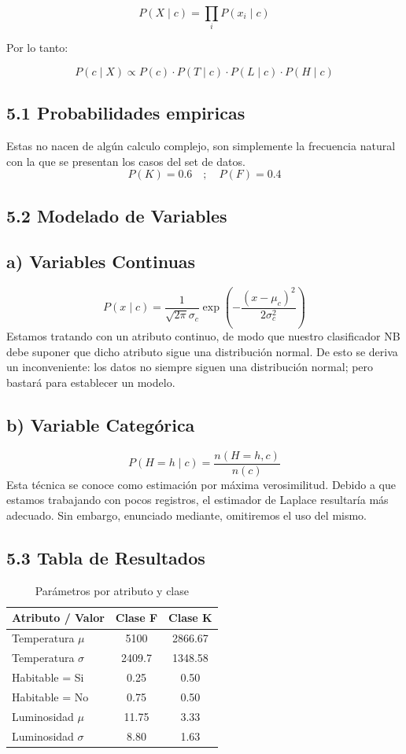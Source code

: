 \documentclass[11pt,a4paper]{article}
\begin{document}
\[
P(X \mid c) = \prod_{i} P(x_i \mid c)
\]

Por lo tanto:

\[
P(c \mid X) \propto P(c)\cdot P(T \mid c)\cdot P(L \mid c)\cdot P(H \mid c)
\]

\subsection*{5.1 Probabilidades empiricas}
Estas no nacen de algún calculo complejo, son simplemente la frecuencia natural con la que se presentan los casos del set de datos.
\[
P(K) = 0.6 \quad ; \quad P(F) = 0.4
\]

\subsection*{5.2 Modelado de Variables}

\subsection*{a) Variables Continuas}

\[
P(x \mid c)=\frac{1}{\sqrt{2\pi}\sigma_c} \exp\left(-\frac{(x-\mu_c)^2}{2\sigma_c^2}\right)
\]
Estamos tratando con un atributo continuo, de modo que nuestro clasificador NB debe suponer que dicho atributo sigue una distribución normal. De esto se deriva un inconveniente: los datos no siempre siguen una distribución normal; pero bastará para establecer un modelo.

\subsection*{b) Variable Categórica}

\[
P(H=h \mid c)=\frac{n(H=h, c)}{n(c)}
\]
Esta técnica se conoce como estimación por máxima verosimilitud. Debido a que estamos trabajando con pocos registros, el estimador de Laplace resultaría más adecuado. Sin embargo, enunciado mediante, omitiremos el uso del mismo.


\subsection*{5.3 Tabla de Resultados}

\begin{table}[h]
\centering
\begin{tabular}{|l|c|c|}
\hline
\textbf{Atributo / Valor} & \textbf{Clase F} & \textbf{Clase K} \\
\hline
Temperatura $\mu$ & 5100 & 2866.67 \\
Temperatura $\sigma$ & 2409.7 & 1348.58 \\
Habitable = Si & 0.25 & 0.50 \\
Habitable = No & 0.75 & 0.50 \\
Luminosidad $\mu$ & 11.75 & 3.33 \\
Luminosidad $\sigma$ & 8.80 & 1.63 \\
\hline
\end{tabular}
\caption{Parámetros por atributo y clase}
\end{table}
\end{document}
